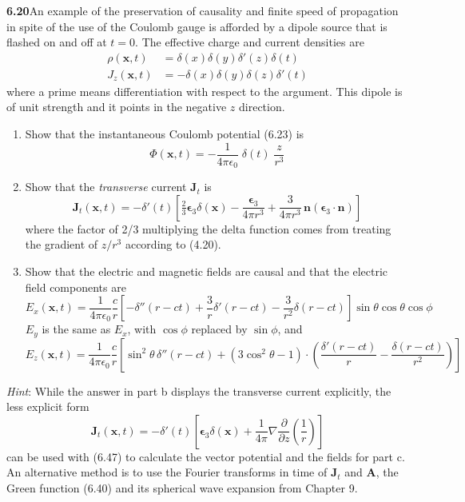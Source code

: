\par\bigskip
\noindent\textbf{6.20}\quad An example of the preservation of causality and finite speed of propagation in spite of the use of the Coulomb gauge is afforded by a dipole source that is flashed on and off at $t=0$. The effective charge and current densities are
\begin{align*}
\rho(\mathbf{x},t)&=\delta(x)\delta(y)\delta'(z)\delta(t)\\
J_{z}(\mathbf{x},t)&=-\delta(x)\delta(y)\delta(z)\delta'(t)
\end{align*}
where a prime means differentiation with respect to the argument. This dipole is of unit strength and it points in the negative $z$ direction.
\begin{enumerate}
\item[(a)] Show that the instantaneous Coulomb potential (6.23) is
\[
\Phi(\mathbf{x},t)=-\frac{1}{4\pi\epsilon_{0}}\;\delta(t)\;\frac{z}{r^{3}}
\]
\item[(b)] Show that the \emph{transverse} current $\mathbf{J}_{t}$ is
\[
\mathbf{J}_{t}(\mathbf{x},t)=-\delta'(t)\!\left[\tfrac{2}{3}\boldsymbol{\epsilon}_{3}\delta(\mathbf{x})-\frac{\boldsymbol{\epsilon}_{3}}{4\pi r^{3}}+\frac{3}{4\pi r^{3}}\,\mathbf{n}(\boldsymbol{\epsilon}_{3}\cdot\mathbf{n})\right]
\]
where the factor of 2/3 multiplying the delta function comes from treating the gradient of $z/r^{3}$ according to (4.20).
\item[(c)] Show that the electric and magnetic fields are causal and that the electric field components are
\[
E_{x}(\mathbf{x},t)=\frac{1}{4\pi\epsilon_{0}}\frac{c}{r}\left[-\delta''(r-ct)+\frac{3}{r}\delta'(r-ct)-\frac{3}{r^{2}}\delta(r-ct)\right]\sin\theta\cos\theta\cos\phi
\]
$E_{y}$ is the same as $E_{x}$, with $\cos\phi$ replaced by $\sin\phi$, and
\[
E_{z}(\mathbf{x},t)=\frac{1}{4\pi\epsilon_{0}}\frac{c}{r}\left[\sin^{2}\theta\,\delta''(r-ct)+(3\cos^{2}\theta-1)\cdot\left(\frac{\delta'(r-ct)}{r}-\frac{\delta(r-ct)}{r^{2}}\right)\right]
\]
\end{enumerate}
\emph{Hint}: While the answer in part b displays the transverse current explicitly, the less explicit form
\[
\mathbf{J}_{t}(\mathbf{x},t)=-\delta'(t)\!\left[\boldsymbol{\epsilon}_{3}\delta(\mathbf{x})+\frac{1}{4\pi}\nabla\frac{\partial}{\partial z}\left(\frac{1}{r}\right)\right]
\]
can be used with (6.47) to calculate the vector potential and the fields for part c. An alternative method is to use the Fourier transforms in time of $\mathbf{J}_{t}$ and $\mathbf{A}$, the Green function (6.40) and its spherical wave expansion from Chapter 9.
\solution

